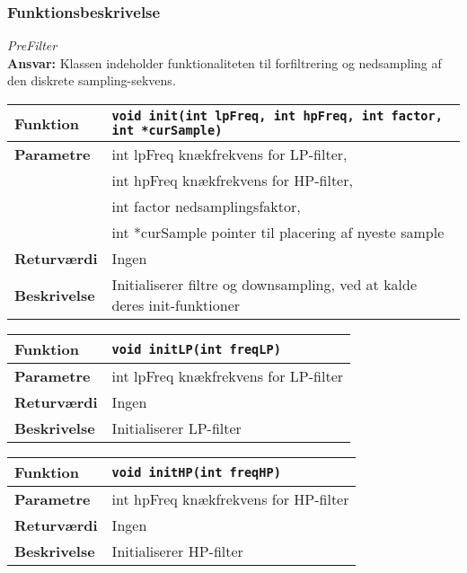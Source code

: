 \subsubsection*{Funktionsbeskrivelse}

\textit{PreFilter} \\
\textbf{Ansvar:} Klassen indeholder funktionaliteten til forfiltrering og nedsampling af den diskrete sampling-sekvens.


\begin{center}
    \begin{tabular}{ | l | p{} |}
    \hline
    \textbf{Funktion}	& \verb+void init(int lpFreq, int hpFreq, int factor, int *curSample) +						\\ \hline
    \textbf{Parametre} 	& int lpFreq knækfrekvens for LP-filter,\\&
    						  int hpFreq knækfrekvens for HP-filter,\\&
    						  int factor nedsamplingsfaktor, \\&
    						  int *curSample pointer til placering af nyeste sample		\\ \hline
    \textbf{Returværdi}	& Ingen																				\\ \hline
    \textbf{Beskrivelse}	& Initialiserer filtre og downsampling, ved at kalde deres init-funktioner		\\ \hline
    \end{tabular}
\end{center}

\begin{center}
    \begin{tabular}{ | l | p{} |}
    \hline
    \textbf{Funktion}	& \verb+void initLP(int freqLP) +						\\ \hline
    \textbf{Parametre} 	& int lpFreq knækfrekvens for LP-filter		\\ \hline
    \textbf{Returværdi}	& Ingen 								\\ \hline
    \textbf{Beskrivelse}	& Initialiserer LP-filter		\\ \hline
    \end{tabular}
\end{center}

\begin{center}
    \begin{tabular}{ | l | p{} |}
    \hline
    \textbf{Funktion}	& \verb+void initHP(int freqHP) +						\\ \hline
    \textbf{Parametre} 	& int hpFreq knækfrekvens for HP-filter		\\ \hline
    \textbf{Returværdi}	& Ingen 								\\ \hline
    \textbf{Beskrivelse}	& Initialiserer HP-filter		\\ \hline
    \end{tabular}
\end{center}

